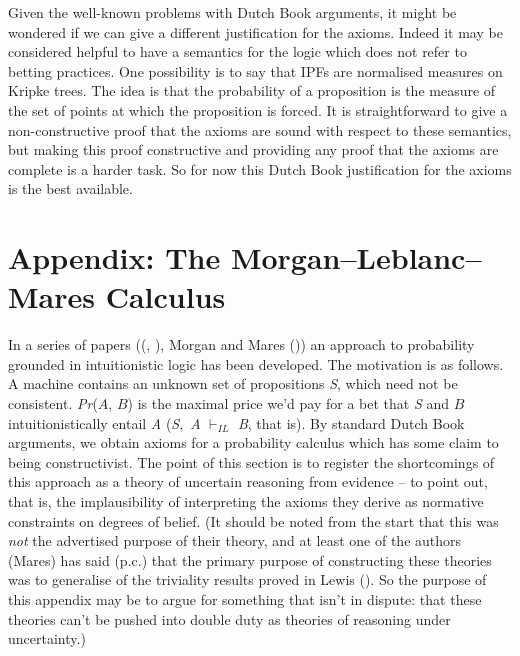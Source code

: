 \documentclass[
  11pt,
  letterpaper,
  DIV=11,
  numbers=noendperiod,
  oneside]{scrartcl}
\begin{document}
Given the well-known problems with Dutch Book arguments, it might be wondered if we can give
a different justification for the axioms. Indeed it may be considered
helpful to have a semantics for the logic which does not refer to
betting practices. One possibility is to say that IPFs are normalised
measures on Kripke trees. The idea is that the probability of a
proposition is the measure of the set of points at which the proposition
is forced. It is straightforward to give a non-constructive proof that
the axioms are sound with respect to these semantics, but making this
proof constructive and providing any proof that the axioms are complete
is a harder task. So for now this Dutch Book justification for the
axioms is the best available.

\section*{Appendix: The Morgan--Leblanc--Mares
Calculus}\label{appendix-the-morganleblancmares-calculus}

In a series of papers ((, ), Morgan and
Mares ()) an approach to probability
grounded in intuitionistic logic has been developed. The motivation is
as follows. A machine contains an unknown set of propositions \emph{S},
which need not be consistent. \emph{Pr}(\(A\), \(B\)) is the maximal
price we'd pay for a bet that \emph{S} and \(B\) intuitionistically
entail \emph{A} (\emph{S},~\emph{A} \(\vdash_{IL}\) \emph{B}, that is).
By standard Dutch Book arguments, we obtain axioms for a probability
calculus which has some claim to being constructivist. The point of this
section is to register the shortcomings of this approach as a theory of
uncertain reasoning from evidence -- to point out, that is, the
implausibility of interpreting the axioms they derive as normative
constraints on degrees of belief. (It should be noted from the start
that this was \emph{not} the advertised purpose of their theory, and at
least one of the authors (Mares) has said (p.c.) that the primary
purpose of constructing these theories was to generalise of the
triviality results proved in Lewis (). So
the purpose of this appendix may be to argue for something that isn't in
dispute: that these theories can't be pushed into double duty as
theories of reasoning under uncertainty.)
\end{document}
